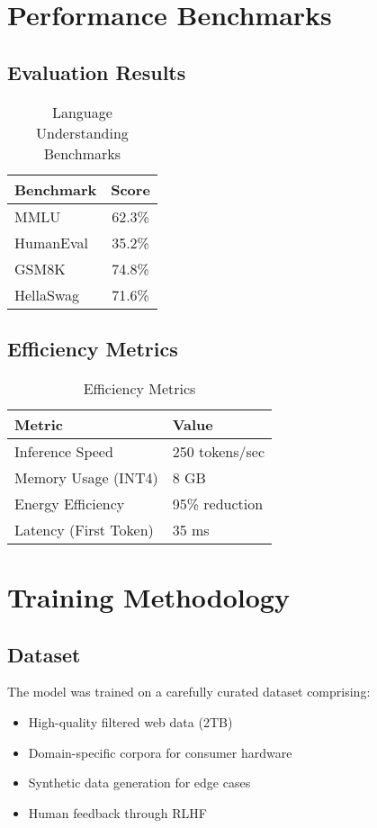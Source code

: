 \documentclass[11pt,a4paper]{article}
\begin{document}
\section{Performance Benchmarks}

\subsection{Evaluation Results}


\begin{table}[H]
\centering
\begin{tabular}{lc}
\toprule
\textbf{Benchmark} & \textbf{Score} \\
\midrule
MMLU & 62.3\% \\
HumanEval & 35.2\% \\
GSM8K & 74.8\% \\
HellaSwag & 71.6\% \\
\bottomrule
\end{tabular}
\caption{Language Understanding Benchmarks}
\end{table}

\subsection{Efficiency Metrics}

\begin{table}[H]
\centering
\begin{tabular}{ll}
\toprule
\textbf{Metric} & \textbf{Value} \\
\midrule
Inference Speed & 250 tokens/sec \\
Memory Usage (INT4) & 8 GB \\
Energy Efficiency & 95\% reduction \\
Latency (First Token) & 35 ms \\
\bottomrule
\end{tabular}
\caption{Efficiency Metrics}
\end{table}

\section{Training Methodology}

\subsection{Dataset}
The model was trained on a carefully curated dataset comprising:
\begin{itemize}
    \item High-quality filtered web data (2TB)
    \item Domain-specific corpora for consumer hardware
    \item Synthetic data generation for edge cases
    \item Human feedback through RLHF
\end{itemize}
\end{document}
